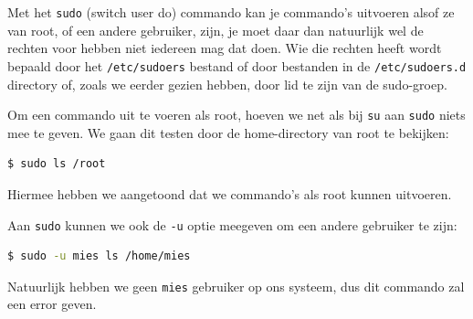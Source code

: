 Met het \texttt{sudo} (switch user do) commando kan je commando's uitvoeren alsof ze van root, of een andere gebruiker, zijn, je moet daar dan natuurlijk wel de rechten voor hebben niet iedereen mag dat doen. Wie die rechten heeft wordt bepaald door het \texttt{/etc/sudoers} bestand of door bestanden in de \texttt{/etc/sudoers.d} directory of, zoals we eerder gezien hebben, door lid te zijn van de sudo-groep.

Om een commando uit te voeren als root, hoeven we net als bij \texttt{su} aan \texttt{sudo} niets mee te geven. We gaan dit testen door de home-directory van root te bekijken:
\begin{lstlisting}[language=bash]
$ sudo ls /root
\end{lstlisting}
Hiermee hebben we aangetoond dat we commando's als root kunnen uitvoeren.

Aan \texttt{sudo} kunnen we ook de \texttt{-u} optie meegeven om een andere gebruiker te zijn:
\begin{lstlisting}[language=bash]
$ sudo -u mies ls /home/mies
\end{lstlisting}
Natuurlijk hebben we geen \texttt{mies} gebruiker op ons systeem, dus dit commando zal een error geven.

